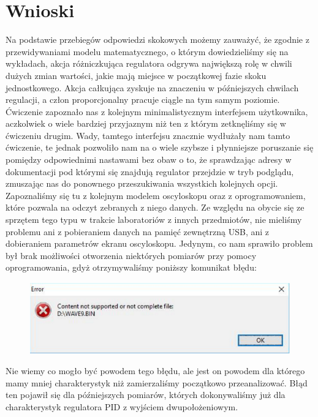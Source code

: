 \documentclass[a4paper, 12pt]{article}
\begin{document}
	\section{Wnioski}
		Na podstawie przebiegów odpowiedzi skokowych możemy zauważyć, że zgodnie z przewidywaniami modelu matematycznego, o którym dowiedzieliśmy się na wykładach, akcja różniczkująca regulatora odgrywa największą rolę w chwili dużych zmian wartości, jakie mają miejsce w początkowej fazie skoku jednostkowego. Akcja całkująca zyskuje na znaczeniu w późniejszych chwilach regulacji, a człon proporcjonalny pracuje ciągle na tym samym poziomie.
		\newline
		\newline
		Ćwiczenie zapoznało nas z kolejnym minimalistycznym interfejsem użytkownika, aczkolwiek o wiele bardziej przyjaznym niż ten z którym zetknęliśmy się w ćwiczeniu drugim. Wady, tamtego interfejsu znacznie wydłużały nam tamto ćwiczenie, te jednak pozwoliło nam na o wiele szybsze i płynniejsze poruszanie się pomiędzy odpowiednimi nastawami bez obaw o to, że sprawdzając adresy w dokumentacji pod którymi się znajdują regulator przejdzie w tryb podglądu, zmuszając nas do ponownego przeszukiwania wszystkich kolejnych opcji.
		\newline
		\newline
		Zapoznaliśmy się tu z kolejnym modelem oscyloskopu oraz z oprogramowaniem, które pozwala na odczyt zebranych z niego danych. Ze względu na obycie się ze sprzętem tego typu w trakcie laboratoriów z innych przedmiotów, nie mieliśmy problemu ani z pobieraniem danych na pamięć zewnętrzną USB, ani z dobieraniem parametrów ekranu oscyloskopu. Jedynym, co nam sprawiło problem był brak możliwości otworzenia niektórych pomiarów przy pomocy oprogramowania, gdyż otrzymywaliśmy poniższy komunikat błędu:
		\begin{figure}[H]
			\centering
			\includegraphics[width=\textwidth]{./grafika/error.png}
		\end{figure}
		Nie wiemy co mogło być powodem tego błędu, ale jest on powodem dla którego mamy mniej charakterystyk niż zamierzaliśmy początkowo przeanalizować. Błąd ten pojawił się dla późniejszych pomiarów, których dokonywaliśmy już dla charakterystyk regulatora PID z wyjściem dwupołożeniowym.
\end{document}

